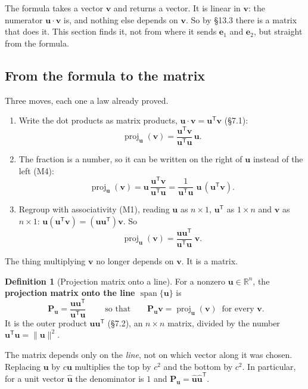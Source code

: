 \documentclass[11pt]{article}
\theoremstyle{plain}
\theoremstyle{definition}
\newtheorem{defn}{Definition}[section]
\theoremstyle{remark}
\newcommand{\R}{\mathbb{R}}
\newcommand{\vc}[1]{\mathbf{#1}}
\newcommand{\mt}[1]{\mathbf{#1}}
\newcommand{\norm}[1]{\lVert #1\rVert}
\newcommand{\T}{^{\mathsf{T}}}
\newcommand{\proj}[2]{\operatorname{proj}_{#1}(#2)}
\DeclareMathOperator{\spanop}{span}
\begin{document}
The formula takes a vector $\vc{v}$ and returns a vector. It is linear in
$\vc{v}$: the numerator $\vc{u}\cdot\vc{v}$ is, and nothing else depends on
$\vc{v}$. So by \S13.3 there is a matrix that does it. This section finds it, not
from where it sends $\vc{e}_1$ and $\vc{e}_2$, but straight from the formula.

\subsection{From the formula to the matrix}
Three moves, each one a law already proved.
\begin{enumerate}[label=(\arabic*),leftmargin=2em,itemsep=4pt]
  \item Write the dot products as matrix products, $\vc{u}\cdot\vc{v}=\vc{u}\T\vc{v}$
        (\S7.1):
        \[\proj{\vc{u}}{\vc{v}}=\frac{\vc{u}\T\vc{v}}{\vc{u}\T\vc{u}}\,\vc{u}.\]
  \item The fraction is a number, so it can be written on the right of $\vc{u}$
        instead of the left (M4):
        \[\proj{\vc{u}}{\vc{v}}=\vc{u}\,\frac{\vc{u}\T\vc{v}}{\vc{u}\T\vc{u}}
          =\frac{1}{\vc{u}\T\vc{u}}\;\vc{u}\,(\vc{u}\T\vc{v}).\]
  \item Regroup with associativity (M1), reading $\vc{u}$ as $n\times1$,
        $\vc{u}\T$ as $1\times n$ and $\vc{v}$ as $n\times1$:
        $\vc{u}(\vc{u}\T\vc{v})=(\vc{u}\vc{u}\T)\vc{v}$. So
        \[\proj{\vc{u}}{\vc{v}}=\frac{\vc{u}\vc{u}\T}{\vc{u}\T\vc{u}}\;\vc{v}.\]
\end{enumerate}
The thing multiplying $\vc{v}$ no longer depends on $\vc{v}$. It is a matrix.

\begin{defn}[Projection matrix onto a line]
For a nonzero $\vc{u}\in\R^{n}$, the \textbf{projection matrix onto the line
$\spanop\{\vc{u}\}$} is
\[
  \boxed{\;\mt{P}_{\vc{u}}=\frac{\vc{u}\vc{u}\T}{\vc{u}\T\vc{u}}\;}
  \qquad\text{so that}\qquad
  \mt{P}_{\vc{u}}\vc{v}=\proj{\vc{u}}{\vc{v}}\ \text{ for every }\vc{v}.
\]
It is the outer product $\vc{u}\vc{u}\T$ (\S7.2), an $n\times n$ matrix, divided
by the number $\vc{u}\T\vc{u}=\norm{\vc{u}}^{2}$.
\end{defn}

\noindent The matrix depends only on the \emph{line}, not on which vector along
it was chosen. Replacing $\vc{u}$ by $c\vc{u}$ multiplies the top by $c^{2}$ and
the bottom by $c^{2}$. In particular, for a unit vector $\hat{\vc{u}}$ the
denominator is $1$ and $\mt{P}_{\vc{u}}=\hat{\vc{u}}\hat{\vc{u}}\T$.
\end{document}
